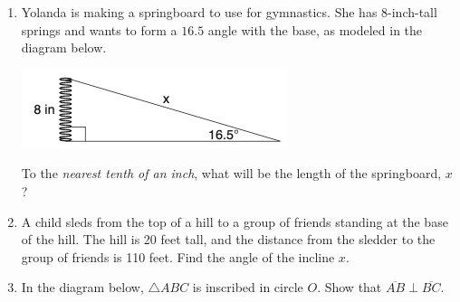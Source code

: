 \documentclass[12pt, twoside]{article}
\begin{document}
\begin{enumerate}
\item Yolanda is making a springboard to use for gymnastics. She has 8-inch-tall springs and wants to form a $16.5$ angle with the base, as modeled in the diagram below.
\begin{center}
  \includegraphics[scale=0.6]{../graphics/trig-spring.png}
\end{center}
To the \emph{nearest tenth of an inch}, what will be the length of the springboard, $x$? \vspace{4cm}

\item A child sleds from the top of a hill to a group of friends standing at the base of the hill. The hill is 20 feet tall, and the distance from the sledder to the group of friends is 110 feet. Find the angle of the incline $x$.
\begin{flushright}
\end{flushright}\vspace{4cm}
  
\newpage
\item In the diagram below, $\triangle ABC$ is inscribed in circle $O$. Show that $\overline{AB} \perp \overline{BC}$.
    \begin{flushright}
    \end{flushright} \vspace{1cm}


\end{enumerate}
\end{document}
